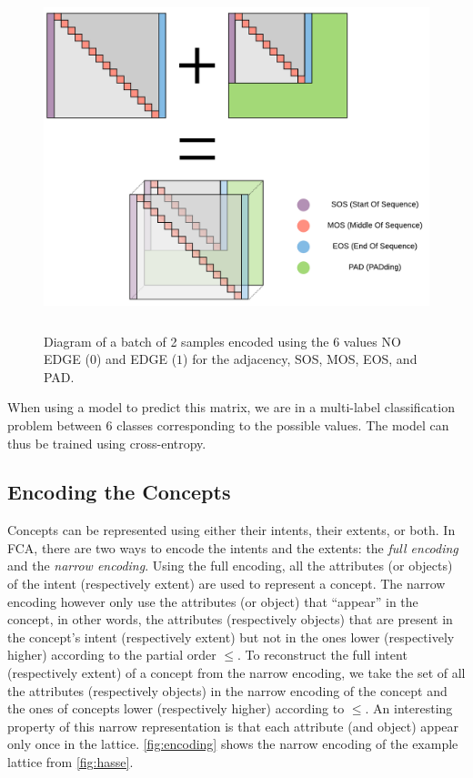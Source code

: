 \begin{figure}
    \centering
    \includegraphics[keepaspectratio, width=.9\textwidth, height=10cm]{Figures/Ch1/pad.png}
    \caption{Diagram of a batch of 2 samples encoded using the 6 values NO EDGE ($0$) and EDGE ($1$) for the adjacency, SOS, MOS, EOS, and PAD.}
    \label{fig:data-pad}
\end{figure}

When using a model to predict this matrix, we are in a multi-label classification problem between 6 classes corresponding to the possible values.
The model can thus be trained using cross-entropy.

\subsection{Encoding the Concepts\label{sec:enc-intents-extents}}
Concepts can be represented using either their intents, their extents, or both.
In FCA, there are two ways to encode the intents and the extents: the \textit{full encoding} and the \textit{narrow encoding}.
Using the full encoding, all the attributes (or objects) of the intent (respectively extent) are used to represent a concept.
The narrow encoding however only use the attributes (or object) that ``appear'' in the concept, in other words, the attributes (respectively objects) that are present in the concept's intent (respectively extent) but not in the ones lower (respectively higher) according to the partial order $\leq$.
To reconstruct the full intent (respectively extent) of a concept from the narrow encoding, we take the set of all the attributes (respectively objects) in the narrow encoding of the concept and the ones of concepts lower (respectively higher) according to $\leq$.
An interesting property of this narrow representation is that each attribute (and object) appear only once in the lattice.
\cref{fig:encoding} shows the narrow encoding of the example lattice from \cref{fig:hasse}.

